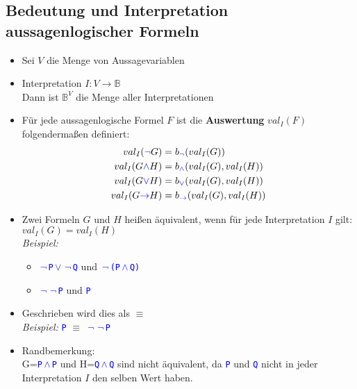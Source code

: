 \documentclass{article}
\newcommand{\blue}[1]{\textcolor{blue}{#1}}
\newcommand{\strongColor}[1]{\textcolor{strongColor}{#1}}
\newcommand{\strong}[1]{\textbf{\strongColor{#1}}}
\newcommand{\important}[1]{\textcolor{importantColor}{#1}}
\newcommand{\example}[1]{\textit{Beispiel: }#1}
\newcommand{\word}[1]{\blue{\texttt{#1}}}
\newcommand{\wnot}{$\,$\word{$\lnot$}$\,$}
\newcommand{\wand}{$\,$\word{$\land$}$\,$}
\newcommand{\wor}{$\,$\word{$\lor$}$\,$}
\begin{document}
\subsection{Bedeutung und Interpretation aussagenlogischer Formeln}
\begin{itemize}
    \item Sei $V$ die Menge von Aussagevariablen
    \item \important{Interpretation} $I: V \to \mathbb{B}$\\
    Dann ist $\mathbb{B}^V$ die Menge aller Interpretationen
    \item Für jede aussagenlogische Formel $F$ ist die \strong{Auswertung} \important{$val_I(F)$} folgendermaßen definiert:
    \begin{align*}
        val_I(\word{$\lnot$} G) &= b_{\word{$\lnot$}}(val_I(G)) \\
        val_I(G\word{$\land$}H) &= b_{\word{$\land$}}(val_I(G), val_I(H)) \\
        val_I(G\word{$\lor$}H) &= b_{\word{$\lor$}}(val_I(G), val_I(H)) \\
        val_I(G\word{$\rightarrow$}H) &= b_{\word{$\rightarrow$}}(val_I(G), val_I(H)) \\
    \end{align*}
    
    \item Zwei Formeln $G$ und $H$ heißen \important{äquivalent}, wenn für jede Interpretation $I$ gilt:\\
    $val_I(G) = val_I(H)$\\
    \example
    \begin{itemize}
        \item \word{\wnot P\wor \wnot Q} und \word{\wnot (P\wand Q)}
        \item \word{\wnot\wnot P} und \word{P}
    \end{itemize}
    \item Geschrieben wird dies als \important{$\equiv$}\\\example{\word{P} $\equiv$ \word{\wnot\wnot P}}
    \item Randbemerkung:\\
    G=\word{P\wand P} und H=\word{Q\wand Q} sind nicht äquivalent, da \word{P} und \word{Q} nicht in jeder Interpretation $I$ den selben Wert haben.
    
\end{itemize}
\end{document}
